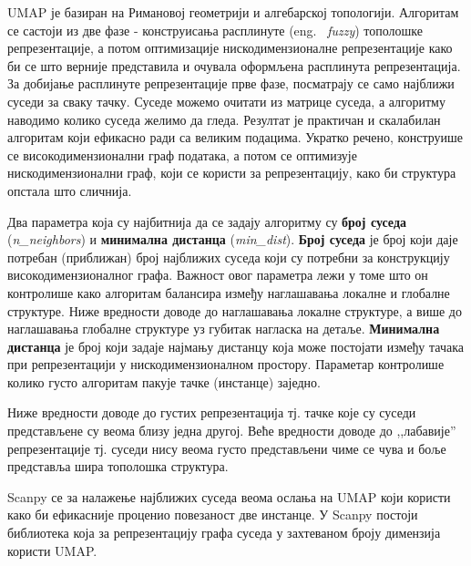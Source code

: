 \documentclass[10pt, a4paper]{article}
\begin{document}
UMAP је базиран на Римановој геометрији и алгебарској топологији. \cite{understanding_umap} Алгоритам се састоји из две фазе - конструисања расплинуте (eng. ~{\em fuzzy}) тополошке репрезентације, а потом оптимизације нискодимензионалне репрезентације како би се што верније представила и очувала оформљена расплинута репрезентација. За добијање расплинуте репрезентације прве фазе, посматрају се само најближи суседи за сваку тачку. Суседе можемо очитати из матрице суседа, а алгоритму наводимо колико суседа желимо да гледа. Резултат је практичан и скалабилан алгоритам који ефикасно ради са великим подацима. Укратко речено, конструише се високодимензионални граф података, а потом се оптимизује нискодимензионални граф, који се користи за репрезентацију, како би структура опстала што сличнија.

Два параметра која су најбитнија да се задају алгоритму су \textbf{број суседа} ({\em n\_neighbors}) и \textbf{минимална дистанца} ({\em min\_dist}). \textbf{Број суседа} је број који даје потребан (приближан) број најближих суседа који су потребни за конструкцију високодимензионалног графа. Важност овог параметра лежи у томе што он контролише како алгоритам балансира између наглашавања локалне и глобалне структуре. Ниже вредности доводе до наглашавања локалне структуре, а више до наглашавања глобалне структуре уз губитак нагласка на детаље. \textbf{Минимална дистанца} је број који задаје најмању дистанцу која може постојати између тачака при репрезентацији у нискодимензионалном простору. Параметар контролише колико густо алгоритам пакује тачке (инстанце) заједно. 

Ниже вредности доводе до густих репрезентација тј. тачке које су суседи представљене су веома близу једна другој. Веће вредности доводе до ,,лабавије'' репрезентације тј. суседи нису веома густо представљени чиме се чува и боље представља шира тополошка структура.

Scanpy се за налажење најближих суседа веома ослања на UMAP који користи како би ефикасније проценио повезаност две инстанце. У Scanpy постоји библиотека која за репрезентацију графа суседа у захтеваном броју димензија користи UMAP.
\end{document}
